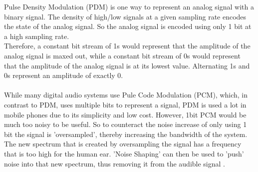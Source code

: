 Pulse Density Modulation (PDM) is one way to represent an analog signal with a binary signal.
The density of high/low signals at a given sampling rate encodes the state of the analog signal.
So the analog signal is encoded using only 1 bit at a high sampling rate.\\
Therefore, a constant bit stream of 1s would represent that the amplitude of the analog signal is maxed out,
while a constant bit stream of 0s would represent that the amplitude of the analog signal is at its lowest value.
Alternating 1s and 0s represent an amplitude of exactly 0.\\\\
While many digital audio systems use Pule Code Modulation (PCM), which, in contrast to PDM, uses multiple bits to represent a signal,
PDM is used a lot in mobile phones \cite{pdm_utexas} due to its simplicity and low cost.
However, 1bit PCM would be much too noisy to be useful.
So to counteract the noise increase of only using 1 bit the signal is 'oversampled', thereby increasing the bandwidth of the system.
The new spectrum that is created by oversampling the signal has a frequency that is too high for the human ear.
'Noise Shaping' can then be used to 'push' noise into that new spectrum, thus removing it from the audible signal \cite{pdm_texas}.
